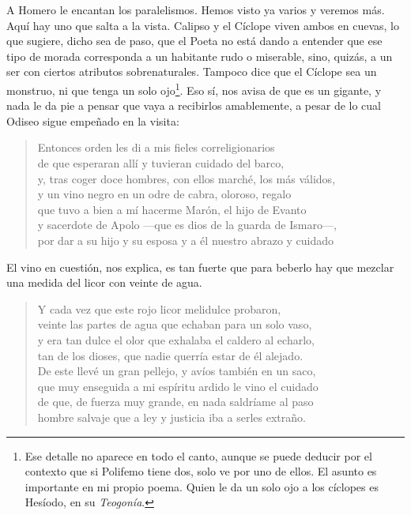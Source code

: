 \documentclass[11pt,a4paper]{article}
\begin{document}
A Homero le encantan los paralelismos. Hemos visto ya varios y veremos más. Aquí hay uno que salta a la vista. Calipso y el Cíclope viven ambos en cuevas, lo que sugiere, dicho sea de paso, que el Poeta no está dando a entender que ese tipo de morada corresponda a un habitante rudo o miserable, sino, quizás, a un ser con ciertos atributos sobrenaturales. Tampoco dice que el Cíclope sea un monstruo, ni que tenga un solo ojo\footnote{Ese detalle no aparece en todo el canto, aunque se puede deducir por el contexto que si Polifemo tiene dos, solo ve por uno de ellos. El asunto es importante en mi propio poema. Quien le da un solo ojo a los cíclopes es Hesíodo, en su \emph{Teogonía}.}. Eso sí, nos avisa de que es un gigante, y nada le da pie a pensar que vaya a recibirlos amablemente, a pesar de lo cual Odiseo sigue empeñado en la visita:

\begin{verse}
Entonces orden les di a mis fieles correligionarios\\
de que esperaran allí y tuvieran cuidado del barco,\\
y, tras coger doce hombres, con ellos marché, los más válidos,\\
y un vino negro en un odre de cabra, oloroso, regalo\\
que tuvo a bien a mí hacerme Marón, el hijo de Evanto\\
y sacerdote de Apolo ---que es dios de la guarda de Ismaro---,\\
por dar a su hijo y su esposa y a él nuestro abrazo y cuidado
\end{verse}

El vino en cuestión, nos explica, es tan fuerte que para beberlo hay que mezclar una medida del licor con veinte de agua.

\begin{verse}
Y cada vez que este rojo licor melidulce probaron,\\
veinte las partes de agua que echaban para un solo vaso,\\
y era tan dulce el olor que exhalaba el caldero al echarlo,\\
tan de los dioses, que nadie querría estar de él alejado.\\
De este llevé un gran pellejo, y avíos también en un saco,\\
que muy enseguida a mi espíritu ardido le vino el cuidado\\
de que, de fuerza muy grande, en nada saldríame al paso\\
hombre salvaje que a ley y justicia iba a serles extraño.
\end{verse}
\end{document}

